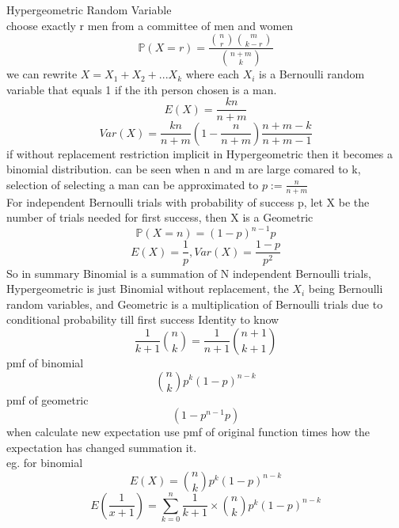\documentclass{article}
\begin{document}
Hypergeometric Random Variable \\
choose exactly r men from a committee of men and women
$$
\mathbb{P}(X=r)=\frac{{n \choose r}{m \choose k-r}}{{n+m \choose k}}
$$
we can rewrite  $X=X_1+X_2+...X_k$
where each $X_i$ is a Bernoulli random variable that equals 1 if the ith person chosen is a man.
$$
E(X)=\frac{kn}{n+m}
$$
$$
Var(X)=\frac{kn}{n+m}(1-\frac{n}{n+m})\frac{n+m-k}{n+m-1}
$$
if without replacement restriction implicit in Hypergeometric then it becomes a binomial distribution. can be seen when n and m are large comared to k, selection of selecting a man can be approximated to $p:=\frac{n}{n+m}$\\
For independent Bernoulli trials with probability of success p, let X be the number of trials needed for first success, then X is a Geometric
$$
\mathbb P(X=n)=(1-p)^{n-1}p
$$
$$
E(X)=\frac{1}{p}, Var(X)=\frac{1-p}{p^2}
$$
So in summary Binomial is a summation of N independent Bernoulli trials, Hypergeometric is just Binomial without replacement, the $X_i$ being Bernoulli random variables, and Geometric is a multiplication of Bernoulli trials due to conditional probability till first success
Identity to know
$$
\frac{1}{k+1}{n \choose k}=\frac{1}{n+1}{n+1 \choose k+1}
$$
pmf of binomial
$$
{n \choose k}p^k(1-p)^{n-k}
$$
pmf of geometric
$$
(1-p^{n-1}p)
$$
when calculate new expectation use pmf of original function times how the expectation has changed summation it.\\
eg. for binomial
$$
E(X)={n \choose k}p^k(1-p)^{n-k}
$$
$$
E(\frac{1}{x+1})=\sum_{k=0}^n\frac{1}{k+1}\times {n \choose k}p^k(1-p)^{n-k}
$$
\end{document}
